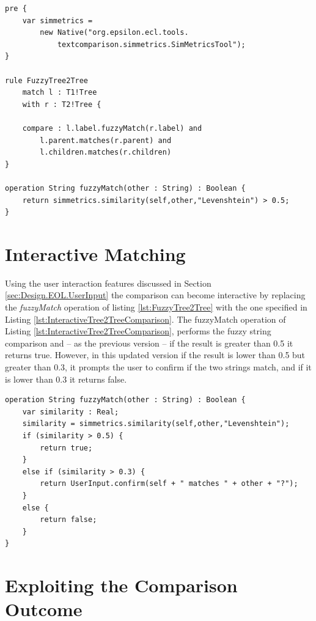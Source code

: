 \begin{lstlisting}[float=tbp, caption=The FuzzyTree2Tree rule, label=lst:FuzzyTree2Tree, language=ECL]
pre {
	var simmetrics = 
		new Native("org.epsilon.ecl.tools.
			textcomparison.simmetrics.SimMetricsTool"); 
}

rule FuzzyTree2Tree 
	match l : T1!Tree
	with r : T2!Tree {
	
	compare : l.label.fuzzyMatch(r.label) and 
		l.parent.matches(r.parent) and
		l.children.matches(r.children)
}

operation String fuzzyMatch(other : String) : Boolean {
	return simmetrics.similarity(self,other,"Levenshtein") > 0.5;
}\end{lstlisting}

\section{Interactive Matching}
\label{sec:InteractiveModelComparison}

Using the user interaction features discussed in Section \ref{sec:Design.EOL.UserInput} the comparison can become interactive by replacing the \emph{fuzzyMatch} operation of listing \ref{lst:FuzzyTree2Tree} with the one specified in Listing \ref{lst:InteractiveTree2TreeComparison}. The fuzzyMatch operation of Listing \ref{lst:InteractiveTree2TreeComparison}, performs the fuzzy string comparison and -- as the previous version -- if the result is greater than 0.5 it returns true. However, in this updated version if the result is lower than 0.5 but greater than 0.3, it prompts the user to confirm if the two strings match, and if it is lower than 0.3 it returns false.

\begin{lstlisting}[float=tbp, caption=An interactive version of the fuzzyMatch operation of Listing \ref{lst:FuzzyTree2Tree}, label=lst:InteractiveTree2TreeComparison, language=ECL]
operation String fuzzyMatch(other : String) : Boolean {
	var similarity : Real;
	similarity = simmetrics.similarity(self,other,"Levenshtein");
	if (similarity > 0.5) {
		return true;
	}
	else if (similarity > 0.3) {
		return UserInput.confirm(self + " matches " + other + "?");
	}
	else {
		return false;
	}
}\end{lstlisting}

\section{Exploiting the Comparison Outcome}

